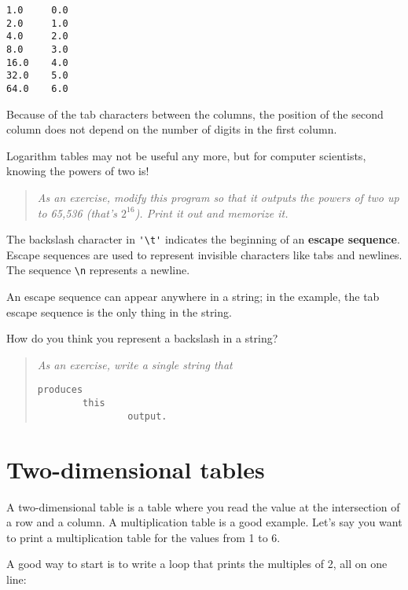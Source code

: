 
\beforeverb
\begin{verbatim}
1.0     0.0
2.0     1.0
4.0     2.0
8.0     3.0
16.0    4.0
32.0    5.0
64.0    6.0
\end{verbatim}
\afterverb
%
Because of the tab characters between the columns, the position of the
second column does not depend on the number of digits in the first
column.

Logarithm tables may not be useful any more, but for computer
scientists, knowing the powers of two is!

\begin{quote}
{\em As an exercise, modify this program so that it outputs the powers
of two up to 65,536 (that's $2^{16}$).  Print it out and memorize it.}
\end{quote}


The backslash character in \verb+'\t'+ indicates the
beginning of an {\bf escape sequence}.  Escape sequences
are used to represent invisible characters like
tabs and newlines.  The sequence \verb+\n+ represents a newline.

An escape sequence can appear
anywhere in a string; in the example, the tab escape
sequence is the only thing in the string.

How do you think you represent a backslash in a string?

\begin{quote}
{\em As an exercise, write a single string that

\beforeverb
\begin{verbatim}
produces
        this
                output.
\end{verbatim}
\afterverb

}
\end{quote}


\section{Two-dimensional tables}

A two-dimensional table is a table where you
read the value at the intersection of a row and a column.  A
multiplication table is a good example.
Let's say you want to print a multiplication table for the values
from 1 to 6.

A good way to start is to write a loop that prints the multiples of
2, all on one line:

